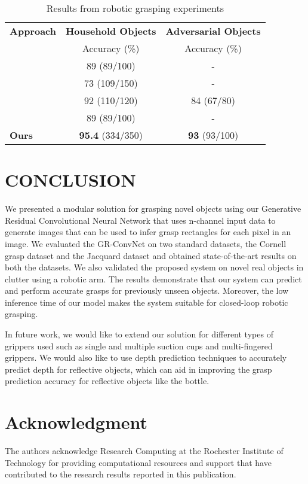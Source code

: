 \documentclass[letterpaper, 10 pt, conference]{ieeeconf}
\begin{document}
\begin{table}
\begin{center}
\caption{Results from robotic grasping experiments}
\label{tab:novel_results}
\begin{tabular}{l c c}
\hline
\textbf{Approach} & \textbf{Household Objects} & \textbf{Adversarial Objects} \\
 & Accuracy (\%) & Accuracy (\%) \\
\hline
\cite{lenz2015deep} & 89 (89/100) & - \\
\cite{pinto2016supersizing} & 73 (109/150) & - \\
\cite{morrison2019learning} & 92 (110/120) & 84 (67/80) \\
\cite{chu2018real} & 89 (89/100) & - \\
\hline
\textbf{Ours} & \textbf{95.4} (334/350) & \textbf{93} (93/100) \\
\hline
\end{tabular}
\end{center}
\end{table}



\section{CONCLUSION}
We presented a modular solution for grasping novel objects using our Generative Residual Convolutional Neural Network that uses n-channel input data to generate images that can be used to infer grasp rectangles for each pixel in an image. We evaluated the GR-ConvNet on two standard datasets, the Cornell grasp dataset and the Jacquard dataset and obtained state-of-the-art results on both the datasets. We also validated the proposed system on novel real objects in clutter using a robotic arm. The results demonstrate that our system can predict and perform accurate grasps for previously unseen objects. Moreover, the low inference time of our model makes the system suitable for closed-loop robotic grasping.

In future work, we would like to extend our solution for different types of grippers used such as single and multiple suction cups and multi-fingered grippers. We would also like to use depth prediction techniques to accurately predict depth for reflective objects, which can aid in improving the grasp prediction accuracy for reflective objects like the bottle.



\section*{Acknowledgment}

The authors acknowledge Research Computing \cite{ritrc} at the Rochester Institute of Technology for providing computational resources and support that have contributed to the research results reported in this publication.




  
\end{document}
